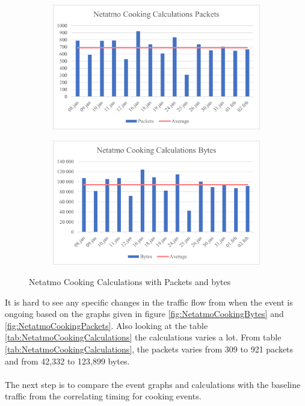 \begin{figure}[H]
    \centering
    \begin{subfigure}{0.49\textwidth}
       \includegraphics[width=1\hsize]{figures/Netatmo_Cooking_Calculations_Packets.png} 
    \end{subfigure}
    \begin{subfigure}{0.49\textwidth}
        \includegraphics[width=1\hsize]{figures/Netatmo_Cooking_Calculations_Bytes.png} 
    \end{subfigure}
    \caption{Netatmo Cooking Calculations with Packets and bytes}
    \label{fig:NetatmoCookingCalculationsPackets}
\end{figure}


It is hard to see any specific changes in the traffic flow from when the event is ongoing based on the graphs given in figure \ref{fig:NetatmoCookingBytes} and \ref{fig:NetatmoCookingPackets}. Also looking at the table \ref{tab:NetatmoCookingCalculations} the calculations varies a lot. From table \ref{tab:NetatmoCookingCalculations}, the packets varies from 309 to 921 packets and from 42,332 to 123,899 bytes. 
\\\\
The next step is to compare the event graphs and calculations with the baseline traffic from the correlating timing for cooking events. 



